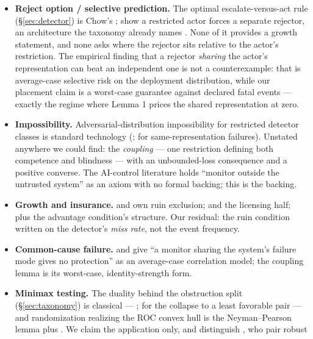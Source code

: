 \documentclass[11pt]{article}
\theoremstyle{plain}
\theoremstyle{definition}
\begin{document}
\begin{itemize}
\item \textbf{Reject option / selective prediction.} The optimal escalate-versus-act
  rule (\S\ref{sec:detector}) is Chow's \citep{chow1957,chow1970}; \citet{cortes2016} show a
  restricted actor forces a separate rejector, an architecture the taxonomy
  already names \citep{hendrickx2024}. None of it provides a growth
  statement, and none asks where the rejector sits relative to the actor's
  restriction. The empirical finding that a rejector \emph{sharing} the
  actor's representation can beat an independent one \citep{geifman2019} is
  not a counterexample: that is average-case selective risk on the deployment
  distribution, while our placement claim is a worst-case guarantee against
  declared fatal events --- exactly the regime where Lemma 1 prices the shared
  representation at zero.
\item \textbf{Impossibility.} Adversarial-distribution impossibility for restricted
  detector classes is standard technology (\citealt{fang2022}; \citealt{ulmer2021}
  for same-representation failures). Unstated anywhere we could find: the
  \emph{coupling} --- one restriction defining both competence and blindness --- with
  an unbounded-loss consequence and a positive converse. The AI-control
  literature \citep{greenblatt2024} holds ``monitor outside the untrusted
  system'' as an axiom with no formal backing; this is the backing.
\item \textbf{Growth and insurance.} \citet{kelly1956} and \citet{breiman1961} own ruin
  exclusion; \citet{peters2015} and \citet{spitznagel2021} the licensing half;
  \citet{ehrlich1972} plus \citet{townsend1979} the advantage condition's
  structure. Our residual: the ruin condition written on the detector's
  \emph{miss rate}, not the event frequency.
\item \textbf{Common-cause failure.} \citet{eckhardt1985} and \citet{littlewood2012}
  give ``a monitor sharing the system's failure mode gives no protection'' as
  an average-case correlation model; the coupling lemma is its worst-case,
  identity-strength form.
\item \textbf{Minimax testing.} The duality behind the obstruction split (\S\ref{sec:taxonomy}) is
  classical --- \citet{wald1945,wald1950}; \citet{huberstrassen1973} for the collapse to a
  least favorable pair --- and randomization realizing the ROC convex hull is
  the Neyman--Pearson lemma \citep{neymanpearson1933} plus \citet{provost2001}. We claim the
  application only, and distinguish \citet{managoli2025}, who pair robust

\end{itemize}
\end{document}
